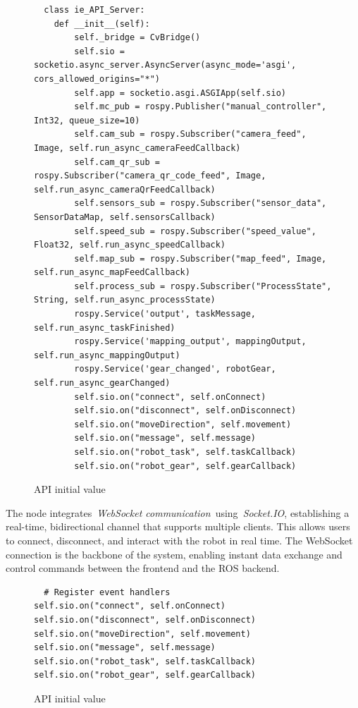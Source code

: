 \documentclass[a4paper,12pt]{extreport}
\begin{document}
\begin{figure}[h!]
  \begin{verbatim}
  class ie_API_Server:
    def __init__(self):
        self._bridge = CvBridge()
        self.sio = socketio.async_server.AsyncServer(async_mode='asgi', cors_allowed_origins="*")
        self.app = socketio.asgi.ASGIApp(self.sio)
        self.mc_pub = rospy.Publisher("manual_controller", Int32, queue_size=10)
        self.cam_sub = rospy.Subscriber("camera_feed", Image, self.run_async_cameraFeedCallback)
        self.cam_qr_sub = rospy.Subscriber("camera_qr_code_feed", Image, self.run_async_cameraQrFeedCallback)
        self.sensors_sub = rospy.Subscriber("sensor_data", SensorDataMap, self.sensorsCallback)
        self.speed_sub = rospy.Subscriber("speed_value", Float32, self.run_async_speedCallback)
        self.map_sub = rospy.Subscriber("map_feed", Image, self.run_async_mapFeedCallback)
        self.process_sub = rospy.Subscriber("ProcessState", String, self.run_async_processState)
        rospy.Service('output', taskMessage, self.run_async_taskFinished)
        rospy.Service('mapping_output', mappingOutput, self.run_async_mappingOutput)
        rospy.Service('gear_changed', robotGear, self.run_async_gearChanged)
        self.sio.on("connect", self.onConnect)
        self.sio.on("disconnect", self.onDisconnect)
        self.sio.on("moveDirection", self.movement)
        self.sio.on("message", self.message)
        self.sio.on("robot_task", self.taskCallback)
        self.sio.on("robot_gear", self.gearCallback)
\end{verbatim}
\caption{API initial value}
\label{judFig16}
\end{figure}

The node integrates~\emph{WebSocket
communication}~using~\emph{Socket.IO}, establishing a real-time,
bidirectional channel that supports multiple clients. This allows users
to connect, disconnect, and interact with the robot in real time. The
WebSocket connection is the backbone of the system, enabling instant
data exchange and control commands between the frontend and the ROS
backend.
\newpage
\begin{figure}[h!]
  \begin{verbatim}
  # Register event handlers
self.sio.on("connect", self.onConnect)
self.sio.on("disconnect", self.onDisconnect)
self.sio.on("moveDirection", self.movement)
self.sio.on("message", self.message)
self.sio.on("robot_task", self.taskCallback)
self.sio.on("robot_gear", self.gearCallback)
\end{verbatim}
\caption{API initial value}
\label{judFig17}
\end{figure}
\end{document}
